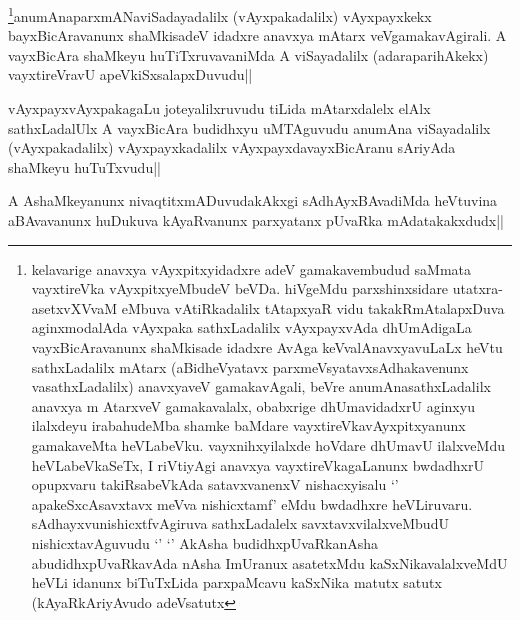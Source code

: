 \begin{artha}
\footnote{kelavarige anavxya vAyxpitxyidadxre adeV gamakavembudud  saMmata vayxtireVka vAyxpitxyeMbudeV beVDa. hiVgeMdu parxshinxsidare utatxra-asetxvXVvaM eMbuva vAtiRkadalilx tAtapxyaR vidu takakRmAtalapxDuva aginxmodalAda vAyxpaka sathxLadalilx vAyxpayxvAda dhUmAdigaLa vayxBicAravanunx shaMkisade idadxre AvAga keVvalAnavxyavuLaLx heVtu sathxLadalilx mAtarx (aBidheVyatavx parxmeVsyatavxsAdhakavenunx vasathxLadalilx) anavxyaveV gamakavAgali, beVre anumAnasathxLadalilx anavxya m AtarxveV gamakavalalx, obabxrige dhUmavidadxrU aginxyu ilalxdeyu irabahudeMba shamke baMdare vayxtireVkavAyxpitxyanunx gamakaveMta heVLabeVku. vayxnihxyilalxde hoVdare dhUmavU ilalxveMdu heVLabeVkaSeTx, I riVtiyAgi anavxya vayxtireVkagaLanunx bwdadhxrU opupxvaru takiRsabeVkAda satavxvanenxV nishacxyisalu `\stext' apakeSxcAsavxtavx meVva nishicxtamf' eMdu bwdadhxre heVLiruvaru. sAdhayxvunishicxtfvAgiruva sathxLadalelx savxtavxvilalxveMbudU nishicxtavAguvudu `\stext' `\stext' AkAsha budidhxpUvaRkanAsha abudidhxpUvaRkavAda nAsha ImUranux asatetxMdu kaSxNikavalalxveMdU heVLi idanunx biTuTxLida parxpaMcavu kaSxNika matutx satutx (kAyaRkAriyAvudo adeVsatutx}anumAnaparxmANaviSadayadalilx (vAyxpakadalilx) vAyxpayxkekx bayxBicAravanunx shaMkisadeV idadxre anavxya mAtarx veVgamakavAgirali. A vayxBicAra shaMkeyu huTiTxruvavaniMda A viSayadalilx (adaraparihAkekx) vayxtireVravU apeVkiSxsalapxDuvudu||
\end{artha}

\begin{artha}
vAyxpayxvAyxpakagaLu joteyalilxruvudu tiLida mAtarxdalelx elAlx sathxLadalUlx A vayxBicAra budidhxyu uMTAguvudu anumAna viSayadalilx (vAyxpakadalilx) vAyxpayxkadalilx vAyxpayxdavayxBicAranu sAriyAda shaMkeyu huTuTxvudu||
\end{artha}

\begin{artha}
A AshaMkeyanunx nivaqtitxmADuvudakAkxgi sAdhAyxBAvadiMda heVtuvina aBAvavanunx huDukuva kAyaRvanunx parxyatanx pUvaRka mAdatakakxdudx||
\end{artha}

